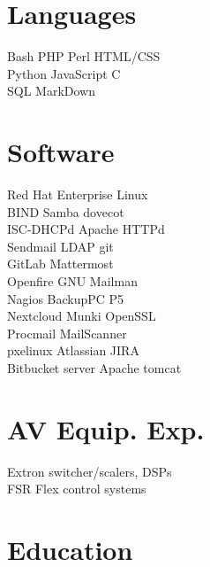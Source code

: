\documentclass[letterpaper]{deedy-resume}
\begin{document}



\begin{minipage}[t]{0.27\textwidth}
\section{Languages}
Bash \textbullet{} PHP \textbullet{} Perl \textbullet{} HTML/CSS \\
Python \textbullet{} JavaScript \textbullet{} C \\
SQL \textbullet{} MarkDown

\sectionspace
\section{Software}
Red Hat Enterprise Linux \\
BIND \textbullet{} Samba \textbullet{} dovecot \\
ISC-DHCPd \textbullet{} Apache HTTPd \\
Sendmail \textbullet{} LDAP \textbullet{} git \\
GitLab \textbullet{}  Mattermost \\
Openfire \textbullet{} GNU Mailman \\
Nagios \textbullet{} BackupPC \textbullet{} P5 \\
Nextcloud \textbullet{} Munki \textbullet{} OpenSSL \\
Procmail \textbullet{} MailScanner \\
pxelinux \textbullet{} Atlassian JIRA \\
Bitbucket server \textbullet{} Apache tomcat

\sectionspace

\section{AV Equip. Exp.}
Extron switcher/scalers, DSPs \\
FSR Flex control systems

\sectionspace

\section{Education}

\end{minipage}
\end{document}
